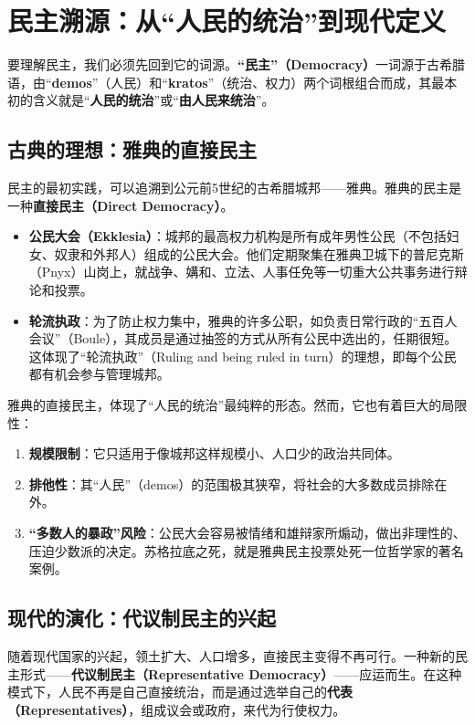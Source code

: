\hrulefill

\section{民主溯源：从“人民的统治”到现代定义}

要理解民主，我们必须先回到它的词源。\textbf{“民主”（Democracy）}一词源于古希腊语，由“\textbf{demos}”（人民）和“\textbf{kratos}”（统治、权力）两个词根组合而成，其最本初的含义就是“\textbf{人民的统治}”或“\textbf{由人民来统治}”。

\subsection{古典的理想：雅典的直接民主}

民主的最初实践，可以追溯到公元前5世纪的古希腊城邦——雅典。雅典的民主是一种\textbf{直接民主（Direct Democracy）}。
\begin{itemize}
    \item \textbf{公民大会（Ekklesia）}：城邦的最高权力机构是所有成年男性公民（不包括妇女、奴隶和外邦人）组成的公民大会。他们定期聚集在雅典卫城下的普尼克斯（Pnyx）山岗上，就战争、媾和、立法、人事任免等一切重大公共事务进行辩论和投票。
    \item \textbf{轮流执政}：为了防止权力集中，雅典的许多公职，如负责日常行政的“五百人会议”（Boule），其成员是通过抽签的方式从所有公民中选出的，任期很短。这体现了“轮流执政”（Ruling and being ruled in turn）的理想，即每个公民都有机会参与管理城邦。
\end{itemize}

雅典的直接民主，体现了“人民的统治”最纯粹的形态。然而，它也有着巨大的局限性：
\begin{enumerate}
    \item \textbf{规模限制}：它只适用于像城邦这样规模小、人口少的政治共同体。
    \item \textbf{排他性}：其“人民”（demos）的范围极其狭窄，将社会的大多数成员排除在外。
    \item \textbf{“多数人的暴政”风险}：公民大会容易被情绪和雄辩家所煽动，做出非理性的、压迫少数派的决定。苏格拉底之死，就是雅典民主投票处死一位哲学家的著名案例。
\end{enumerate}

\subsection{现代的演化：代议制民主的兴起}

随着现代国家的兴起，领土扩大、人口增多，直接民主变得不再可行。一种新的民主形式——\textbf{代议制民主（Representative Democracy）}——应运而生。在这种模式下，人民不再是自己直接统治，而是通过选举自己的\textbf{代表（Representatives）}，组成议会或政府，来代为行使权力。

